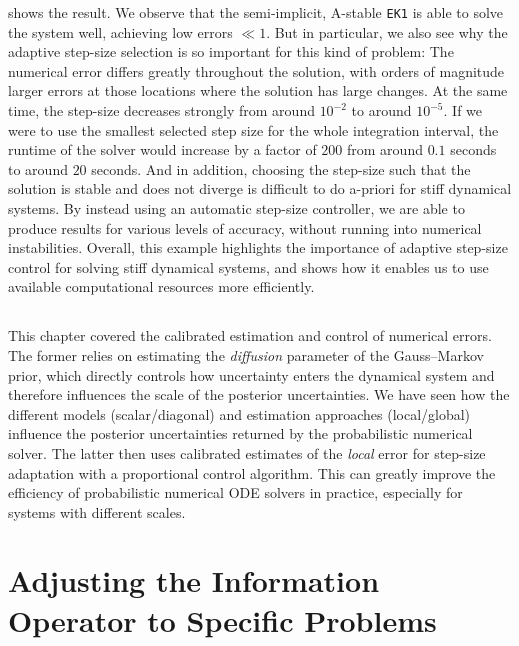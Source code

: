 \documentclass{mimosis}
\begin{document}
 shows the result.
We observe that the semi-implicit, A-stable \texttt{EK1} is able to solve the system well, achieving low errors \(\ll 1\).
But in particular, we also see why the adaptive step-size selection is so important for this kind of problem:
The numerical error differs greatly throughout the solution, with orders of magnitude larger errors at those locations where the solution has large changes.
At the same time, the step-size decreases strongly from around \(10^{-2}\) to around \(10^{-5}\).
If we were to use the smallest selected step size for the whole integration interval, the runtime of the solver would increase by a factor of \(200\) from around \(0.1\) seconds to around \(20\) seconds.
And in addition, choosing the step-size such that the solution is stable and does not diverge is difficult to do a-priori for stiff dynamical systems.
By instead using an automatic step-size controller, we are able to produce results for various levels of accuracy, without running into numerical instabilities.
Overall, this example highlights the importance of adaptive step-size control for solving stiff dynamical systems, and shows how it enables us to use available computational resources more efficiently.
\section{\wrapupsec{}}
\label{sec:orgd270453}
This chapter covered the calibrated estimation and control of numerical errors.
The former relies on estimating the \emph{diffusion} parameter of the Gauss--Markov prior, which directly controls how uncertainty enters the dynamical system and therefore influences the scale of the posterior uncertainties.
We have seen how the different models (scalar/diagonal) and estimation approaches (local/global) influence the posterior uncertainties returned by the probabilistic numerical solver.
The latter then uses calibrated estimates of the \emph{local} error for step-size adaptation with a proportional control algorithm.
This can greatly improve the efficiency of probabilistic numerical ODE solvers in practice, especially for systems with different scales.
\chapter{Adjusting the Information Operator to Specific Problems}
\label{sec:org69a75b7}
\label{sec:flexible-information-operators}
\label{sec:pickandmix}

\end{document}
